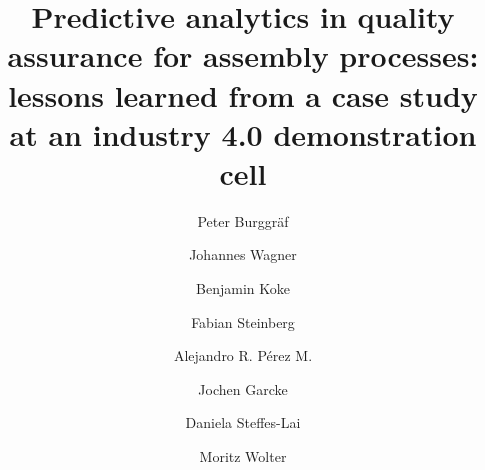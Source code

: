 \documentclass[5p,times,procedia]{elsarticle}
\begin{document}
\begin{frontmatter}



%

\title{Predictive analytics in quality assurance for assembly processes:
       lessons learned from a case study at an industry 4.0 demonstration cell}




\author[a]{Peter Burggräf}
\author[a]{Johannes Wagner}
\author[a]{Benjamin Koke}
\author[a]{Fabian Steinberg} 
\author[a]{Alejandro R. Pérez M.}
\author[b,c]{Jochen Garcke}
\author[b]{Daniela Steffes-Lai}
\author[b,d]{Moritz Wolter}


\address[a]{Chair of International Production Engineering and Management (IPEM), Universität Siegen, Paul-Bonatz-Straße 9-11, Siegen - 57076, Germany}
\address[b]{Fraunhofer Institute for Algorithms and Scientific Computing (SCAI), Schloss Birlinghoven 1, Sankt Augustin- 53757, Germany}
\address[c]{Institut for Numerical Simulation, Universität Siegen, Endenicher Allee 19b, 53115 Bonn}
\address[d]{Institut for Computer Science, Universität Bonn, Endenicher Allee 19A}



\end{frontmatter}
\end{document}
